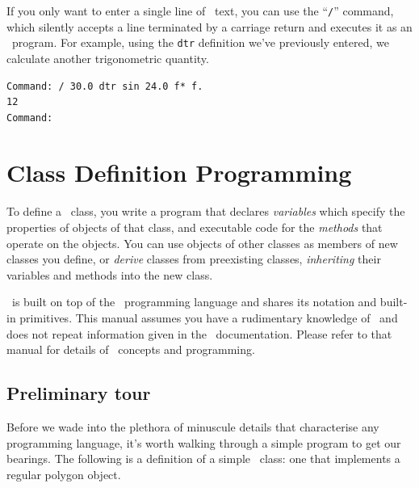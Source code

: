 \documentclass{article}
\begin{document}
If you only want to enter a single line of \atlas\ text, you can use
the ``{\tt /}'' command, which silently accepts a line terminated by a
carriage return and executes it as an \atlas\ program.  For example,
using the {\tt dtr} definition we've previously entered, we
calculate another trigonometric quantity.

\begin{verbatim}
Command: / 30.0 dtr sin 24.0 f* f.
12
Command:
\end{verbatim}

\section{Class Definition Programming}

To define a \cw\ class, you write a program that declares {\em
variables} which specify the properties of objects of that class, and
executable code for the {\em methods} that operate on the objects.
You can use objects of other classes as members of new classes you
define, or {\em derive} classes from preexisting classes, {\em
inheriting} their variables and methods into the new class.

\cw\ is built on top of the \atlas\ programming language and shares
its notation and built-in primitives.  This manual assumes you have a
rudimentary knowledge of \atlas\ and does not repeat information given
in the \atlas\ documentation.  Please refer to that manual for details
of \atlas\ concepts and programming.

\subsection{Preliminary tour}

Before we wade into the plethora of minuscule details that
characterise any programming language, it's worth walking through
a simple program to get our bearings.  The following is a definition
of a simple \cw\ class: one that implements a regular polygon object.
\end{document}
